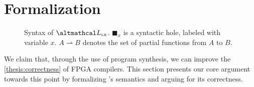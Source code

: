 \section{Formalization}
\label{sec:formalization}

\newsavebox\boxlet
\newsavebox\boxassign
\newsavebox\boxin
\newsavebox\boxreg
\newsavebox\boxprim
{}
\savebox{\boxassign}{\lstinline[language=thelang]!:=!}

\newcommand{\Prim}[0]{\lstinline[language=thelang]{Prim}\xspace}

\newcommand{\Reg}[0]{\lstinline[language=thelang]{Reg}\xspace}

\newcommand{\Let}[0]{\lstinline[language=thelang]{let}\xspace}


\begin{figure*}

\caption{Syntax of $\UberLang$. $\blacksquare_x$ is a syntactic hole, labeled with variable $x$. $A \rightharpoonup B$ denotes the set of partial functions from $A$ to $B$.}
\label{fig:syntax}
\end{figure*}

% 



\noindent
We claim that, through the use of
  program synthesis,
  we can improve the \cref{thesis:correctness}
  of FPGA compilers.
This section presents our core argument
  towards this point
  by formalizing \lr's semantics
  and arguing for its correctness.

